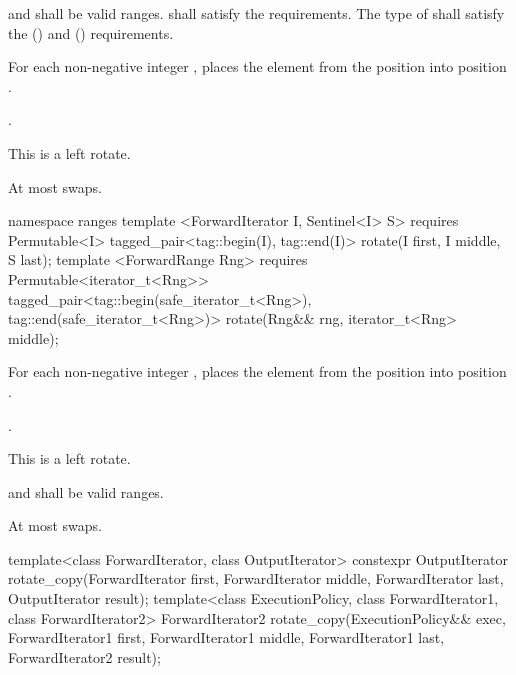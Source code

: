 \begin{itemdescr}
\pnum
\requires
{}
and
shall be valid ranges.
 shall satisfy the
 requirements. The type of  shall satisfy
the  () and
 () requirements.

\pnum
\effects
For each non-negative integer
,
places the element from the position
into position
.

\pnum
\returns {}.

\pnum
\remarks
This is a left rotate.

\pnum
\complexity
At most
swaps.
\end{itemdescr}

\begin{addedblock}
%
\begin{itemdecl}
namespace ranges {
  template <ForwardIterator I, Sentinel<I> S>
      requires Permutable<I>
    tagged_pair<tag::begin(I), tag::end(I)> rotate(I first, I middle, S last);
  template <ForwardRange Rng>
      requires Permutable<iterator_t<Rng>>
    tagged_pair<tag::begin(safe_iterator_t<Rng>), tag::end(safe_iterator_t<Rng>)>
      rotate(Rng&& rng, iterator_t<Rng> middle);
}
\end{itemdecl}

\begin{itemdescr}
\pnum
\effects
For each non-negative integer
,
places the element from the position
into position
.

\pnum
\returns {}.

\pnum
\remarks
This is a left rotate.

\pnum
\requires
{}
and
shall be valid ranges.

\pnum
\complexity
At most
swaps.
\end{itemdescr}
\end{addedblock}

%
\begin{itemdecl}
template<class ForwardIterator, class OutputIterator>
  constexpr OutputIterator
    rotate_copy(ForwardIterator first, ForwardIterator middle, ForwardIterator last,
                OutputIterator result);
template<class ExecutionPolicy, class ForwardIterator1, class ForwardIterator2>
  ForwardIterator2
    rotate_copy(ExecutionPolicy&& exec,
                ForwardIterator1 first, ForwardIterator1 middle, ForwardIterator1 last,
                ForwardIterator2 result);
\end{itemdecl}

